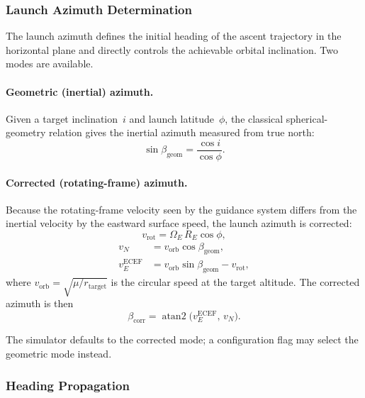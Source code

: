 \subsubsection{Launch Azimuth Determination}
\label{sssec:launch_azimuth}

The launch azimuth defines the initial heading of the ascent trajectory in the
horizontal plane and directly controls the achievable orbital inclination.
Two modes are available.

\paragraph{Geometric (inertial) azimuth.}
Given a target inclination~$i$ and launch latitude~$\phi$, the classical
spherical-geometry relation gives the inertial azimuth measured from true
north:
\begin{equation}
  \sin\beta_{\text{geom}} = \frac{\cos i}{\cos\phi}.
  \label{eq:az_geom}
\end{equation}

\paragraph{Corrected (rotating-frame) azimuth.}
Because the rotating-frame velocity seen by the guidance system differs from
the inertial velocity by the eastward surface speed, the launch azimuth is
corrected:
\begin{equation}
  v_{\text{rot}} = \Omega_E\, R_E\cos\phi,
  \label{eq:vrot}
\end{equation}
\begin{align}
  v_N &= v_{\text{orb}}\cos\beta_{\text{geom}}, \label{eq:vn_corr} \\
  v_E^{\text{ECEF}} &= v_{\text{orb}}\sin\beta_{\text{geom}} - v_{\text{rot}},
  \label{eq:ve_corr}
\end{align}
where $v_{\text{orb}} = \sqrt{\mu/r_{\text{target}}}$ is the circular speed at
the target altitude.  The corrected azimuth is then
\begin{equation}
  \beta_{\text{corr}} = \operatorname{atan2}\!\bigl(v_E^{\text{ECEF}},\, v_N\bigr).
  \label{eq:az_corr}
\end{equation}

The simulator defaults to the corrected mode; a configuration flag may select
the geometric mode instead.

\subsubsection{Heading Propagation}
\label{sssec:heading_propagation}

